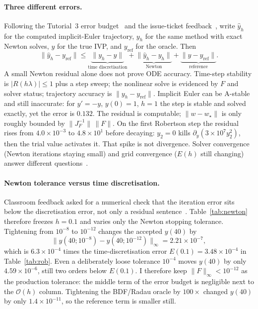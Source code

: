 \documentclass[11pt,a4paper]{article}
\begin{document}
\paragraph{Three different errors.}
Following the Tutorial~3 error budget~\cite{tutorial3supp} and the issue-ticket feedback~\cite{feedbackslides,zhang2026tickets}, write \(\hat y_h\) for the computed implicit-Euler trajectory, \(y_h\) for the same method with exact Newton solves, \(y\) for the true IVP, and \(y_{\mathrm{ref}}\) for the oracle. Then
\begin{equation}
\|\hat y_h-y_{\mathrm{ref}}\|
\le
\underbrace{\|y_h-y\|}_{\text{time discretisation}}
+\underbrace{\|\hat y_h-y_h\|}_{\text{Newton}}
+\underbrace{\|y-y_{\mathrm{ref}}\|}_{\text{reference}}.
\end{equation}
A small Newton residual alone does not prove ODE accuracy. Time-step stability is \(|R(h\lambda)|\le 1\) plus a step sweep; the nonlinear solve is evidenced by \(F\) and solver status; trajectory accuracy is \(\|y_h-y_{\mathrm{ref}}\|\). Implicit Euler can be A-stable and still inaccurate: for \(y'=-y\), \(y(0)=1\), \(h=1\) the step is stable and solved exactly, yet the error is \(0.132\). The residual is computable; \(\|w-w_\star\|\) is only roughly bounded by \(\|J_F^{-1}\|\,\|F\|\). On the first Robertson step the residual rises from \(4.0\times 10^{-3}\) to \(4.8\times 10^{1}\) before decaying: \(y_2=0\) kills \(\partial_y(3\times 10^7 y_2^2)\), then the trial value activates it. That spike is not divergence. Solver convergence (Newton iterations staying small) and grid convergence (\(E(h)\) still changing) answer different questions~\cite{tutorial3supp}.

\paragraph{Newton tolerance versus time discretisation.}
Classroom feedback asked for a numerical check that the iteration error sits below the discretisation error, not only a residual sentence~\cite{feedbackslides,zhang2026tickets}. Table~\ref{tab:newton} therefore freezes \(h=0.1\) and varies only the Newton stopping tolerance. Tightening from \(10^{-8}\) to \(10^{-12}\) changes the accepted \(y(40)\) by
\[
\|y(40;10^{-8})-y(40;10^{-12})\|_\infty=2.21\times 10^{-7},
\]
which is \(6.3\times 10^{-4}\) times the time-discretisation error \(E(0.1)=3.48\times 10^{-4}\) in Table~\ref{tab:rob}. Even a deliberately loose tolerance \(10^{-4}\) moves \(y(40)\) by only \(4.59\times 10^{-6}\), still two orders below \(E(0.1)\). I therefore keep \(\|F\|_\infty<10^{-12}\) as the production tolerance: the middle term of the error budget is negligible next to the \(\mathcal{O}(h)\) column. Tightening the BDF/Radau oracle by \(100\times\) changed \(y(40)\) by only \(1.4\times 10^{-11}\), so the reference term is smaller still.
\end{document}
